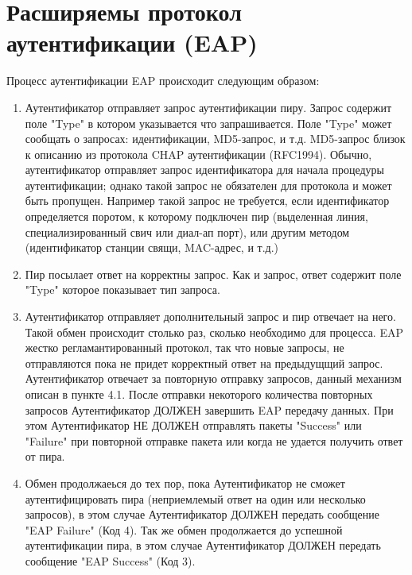 \section{Расширяемы протокол аутентификации (EAP)}

Процесс аутентификации EAP происходит следующим образом:

\begin{enumerate}
\item Аутентификатор отправляет запрос аутентификации пиру. Запрос содержит поле "Type" в котором указывается что запрашивается. Поле "Type" может сообщать о запросах: идентификации, MD5-запрос, и т.д. MD5-запрос близок к описанию из протокола CHAP аутентификации (RFC1994). Обычно, аутентификатор отправляет запрос идентификатора для начала процедуры аутентификации; однако такой запрос не обязателен для протокола и может быть пропущен. Например такой запрос не требуется, если идентификатор определяется поротом, к которому подключен пир (выделенная линия, специализированный свич или диал-ап порт), или другим методом (идентификатор станции свящи, MAC-адрес, и т.д.)
\item Пир посылает ответ на корректны запрос. Как и запрос, ответ содержит поле "Type" которое показывает тип запроса.
\item Аутентификатор отправляет дополнительный запрос и пир отвечает на него. Такой обмен происходит столько раз, сколько необходимо для процесса. EAP жестко регламантированный протокол, так что новые запросы, не отправляются пока не придет корректный ответ на предыдущщий запрос. Аутентификатор отвечает за повторную отправку запросов, данный механизм описан в пункте 4.1. После отправки некоторого количества повторных запросов Аутентификатор ДОЛЖЕН завершить EAP передачу данных. При этом Аутентификатор НЕ ДОЛЖЕН отправлять пакеты "Success" или "Failure" при повторной отправке пакета или когда не удается получить ответ от пира.
\item Обмен продолжаеься до тех пор, пока Аутентификатор не сможет аутентифицировать пира (неприемлемый ответ на один или несколько запросов), в этом случае Аутентификатор ДОЛЖЕН передать сообщение "EAP Failure" (Код 4). Так же обмен продолжается до успешной аутентификации пира, в этом случае Аутентификатор ДОЛЖЕН передать сообщение "EAP Success" (Код 3).
\end{enumerate}
